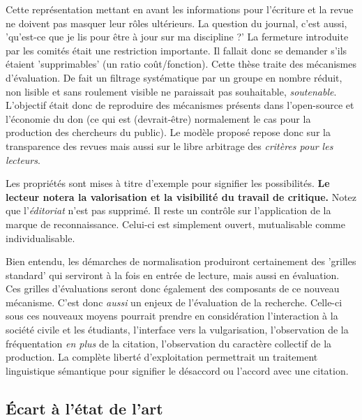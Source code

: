 Cette représentation mettant en avant les informations pour l'écriture et la revue ne doivent pas masquer leur rôles ultérieurs.
La question du journal, c'est aussi, 'qu'est-ce que je lis pour être à jour sur ma discipline ?'
La fermeture introduite par les comités était une restriction importante.
Il fallait donc se demander s'ils étaient 'supprimables' (un ratio coût/fonction).
Cette thèse traite des mécanismes d'évaluation.
De fait un filtrage systématique par un groupe en nombre réduit, non lisible et sans roulement visible ne paraissait pas souhaitable, \emph{soutenable}.
L'objectif était donc de reproduire des mécanismes présents dans l'open-source et l'économie du don (ce qui est (devrait-être) normalement le cas pour la production des chercheurs du public).
Le modèle proposé repose donc sur la transparence des revues mais aussi sur le libre arbitrage des \emph{critères pour les lecteurs}.

Les propriétés sont mises à titre d'exemple pour signifier les possibilités.
\textbf{Le lecteur notera la valorisation et la visibilité du travail de critique.}
Notez que l’\textit{éditoriat} n'est pas supprimé.
Il reste un contrôle sur l'application de la marque de reconnaissance.
Celui-ci est simplement ouvert, mutualisable comme individualisable. 

Bien entendu, les démarches de normalisation produiront certainement des 'grilles standard' qui serviront à la fois en entrée de lecture, mais aussi en évaluation.
Ces grilles d'évaluations seront donc également des composants de ce nouveau mécanisme.
C'est donc \emph{aussi} un enjeux de l'évaluation de la recherche.
Celle-ci sous ces nouveaux moyens pourrait prendre en considération l'interaction à la société civile et les étudiants, l'interface vers la vulgarisation, l'observation de la fréquentation \emph{en plus} de la citation, l'observation du caractère collectif de la production.
La complète liberté d'exploitation permettrait un traitement linguistique sémantique pour signifier le désaccord ou l'accord avec une citation.

\subsection{Écart à l'état de l'art}

